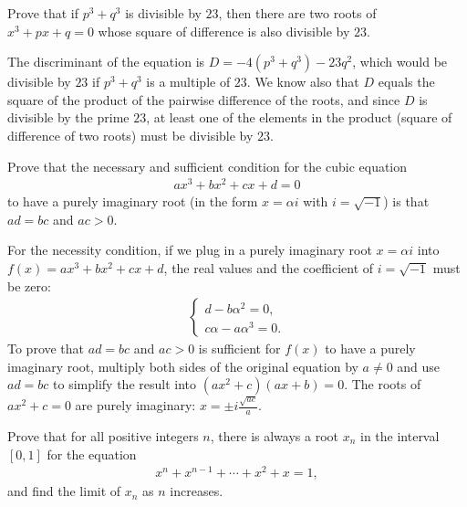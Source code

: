 \begin{question}
    Prove that if $p^3+q^3$ is divisible by $23$, then there are two roots of $x^3+px+q=0$ whose square of difference is also divisible by $23$.
\end{question}

\begin{solution}
    The discriminant of the equation is $D=-4(p^3+q^3)-23q^2$, which would be divisible by $23$ if $p^3+q^3$ is a multiple of $23$. We know also that $D$ equals the square of the product of the pairwise difference of the roots, and since $D$ is divisible by the prime $23$, at least one of the elements in the product (square of difference of two roots) must be divisible by $23$.
\end{solution}


\begin{question}
    Prove that the necessary and sufficient condition for the cubic equation
    \begin{align*}
        ax^3+bx^2+cx+d=0
    \end{align*}
    to have a purely imaginary root (in the form $x=\alpha i$ with $i=\sqrt{-1}$) is that $ad=bc$ and $ac>0$.
\end{question}

\begin{solution}
    For the necessity condition, if we plug in a purely imaginary root $x=\alpha i$ into $f(x)=ax^3+bx^2+cx+d$, the real values and the coefficient of $i=\sqrt{-1}$ must be zero:
    \begin{align*}
        \begin{cases}
            d-b\alpha^2=0,\\ c\alpha-a\alpha^3=0.
        \end{cases}
    \end{align*}
    To prove that $ad=bc$ and $ac>0$ is sufficient for $f(x)$ to have a purely imaginary root, multiply both sides of the original equation by $a\neq 0$ and use $ad=bc$ to simplify the result into $(ax^2+c)(ax+b)=0$. The roots of $ax^2+c=0$ are purely imaginary: $x=\pm i\frac{\sqrt{ac}}{a}$. 
\end{solution}

\begin{question}
    Prove that for all positive integers $n$, there is always a root $x_n$ in the interval $[0,1]$ for the equation
    \begin{align*}
        x^{n} + x^{n-1} + \cdots + x^2 + x = 1,
    \end{align*}
    and find the limit of $x_n$ as $n$ increases.
\end{question}

